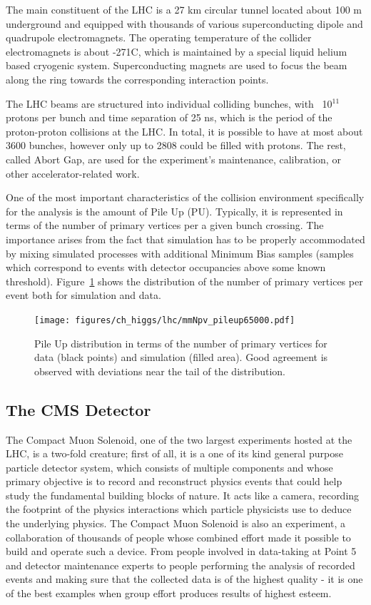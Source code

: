 The main constituent of the LHC is a 27 km circular tunnel located about 100 m underground and equipped with thousands of various superconducting dipole and quadrupole electromagnets. The operating temperature of the collider electromagnets is about -271\textdegree{}C, which is maintained by a special liquid helium based cryogenic system. Superconducting magnets are used to focus the beam along the ring towards the corresponding interaction points.

The LHC beams are structured into individual colliding bunches, with ~10$^{11}$ protons per bunch and time separation of 25 ns, which is the period of the proton-proton collisions at the LHC. In total, it is possible to have at most about 3600 bunches, however only up to 2808 could be filled with protons. The rest, called Abort Gap, are used for the experiment's maintenance, calibration, or other accelerator-related work.

One of the most important characteristics of the collision environment specifically for the analysis is the amount of Pile Up (PU). Typically, it is represented in terms of the number of primary vertices per a given bunch crossing. The importance arises from the fact that simulation has to be properly accommodated by mixing simulated processes with additional Minimum Bias samples (samples which correspond to events with detector occupancies above some known threshold). Figure~\ref{fig:higgs_pu} shows the distribution of the number of primary vertices per event both for simulation and data.
\begin{figure}[htbp]
    \centering
    \texttt{[image: figures/ch\_higgs/lhc/mmNpv\_pileup65000.pdf]}
    \caption{Pile Up distribution in terms of the number of primary vertices for data (black points) and simulation (filled area). Good agreement is observed with deviations near the tail of the distribution.}
    \label{fig:higgs_pu}
 \end{figure}

\subsection{The CMS Detector} \label{subsection:higgs_cms_generaldescription}
The Compact Muon Solenoid, one of the two largest experiments hosted at the LHC, is a two-fold creature; first of all, it is a one of its kind general purpose particle detector system, which consists of multiple components and whose primary objective is to record and reconstruct physics events that could help study the fundamental building blocks of nature. It acts like a camera, recording the footprint of the physics interactions which particle physicists use to deduce the underlying physics. The Compact Muon Solenoid is also an experiment, a collaboration of thousands of people whose combined effort made it possible to build and operate such a device. From people involved in data-taking at Point 5 and detector maintenance experts to people performing the analysis of recorded events and making sure that the collected data is of the highest quality - it is one of the best examples when group effort produces results of highest esteem.

